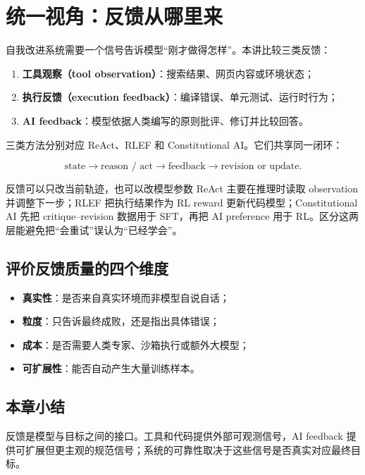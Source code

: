 \section{统一视角：反馈从哪里来}

自我改进系统需要一个信号告诉模型“刚才做得怎样”。本讲比较三类反馈：

\begin{enumerate}
    \item \textbf{工具观察（tool observation）}：搜索结果、网页内容或环境状态；
    \item \textbf{执行反馈（execution feedback）}：编译错误、单元测试、运行时行为；
    \item \textbf{AI feedback}：模型依据人类编写的原则批评、修订并比较回答。
\end{enumerate}


三类方法分别对应 ReAct、RLEF 和 Constitutional AI。它们共享同一闭环：

$$
\text{state}\rightarrow\text{reason / act}\rightarrow\text{feedback}
\rightarrow\text{revision or update}.
$$

\begin{importantbox}{反馈可以只改当前轨迹，也可以改模型参数}
ReAct 主要在推理时读取 observation 并调整下一步；RLEF 把执行结果作为 RL reward 更新代码模型；Constitutional AI 先把 critique--revision 数据用于 SFT，再把 AI preference 用于 RL。区分这两层能避免把“会重试”误认为“已经学会”。
\end{importantbox}

\subsection{评价反馈质量的四个维度}

\begin{itemize}
    \item \textbf{真实性}：是否来自真实环境而非模型自说自话；
    \item \textbf{粒度}：只告诉最终成败，还是指出具体错误；
    \item \textbf{成本}：是否需要人类专家、沙箱执行或额外大模型；
    \item \textbf{可扩展性}：能否自动产生大量训练样本。
\end{itemize}

\subsection{本章小结}

反馈是模型与目标之间的接口。工具和代码提供外部可观测信号，AI feedback 提供可扩展但更主观的规范信号；系统的可靠性取决于这些信号是否真实对应最终目标。

